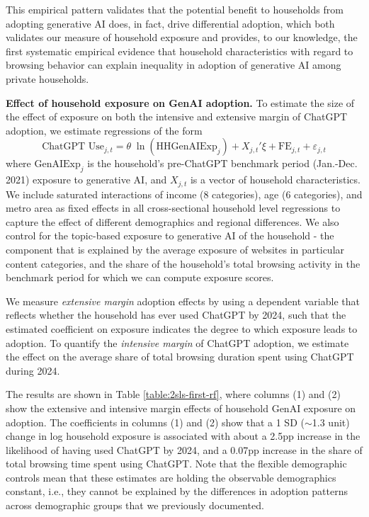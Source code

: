 \documentclass[12pt]{article}
\begin{document}
This empirical pattern validates that the potential benefit to households from adopting generative AI does, in fact, drive differential adoption, which both validates our measure of household exposure and provides, to our knowledge, the first systematic empirical evidence that household characteristics with regard to browsing behavior can explain inequality in adoption of generative AI among private households.

\textbf{Effect of household exposure on GenAI adoption.} To estimate the size of the effect of exposure on both the intensive and extensive margin of ChatGPT adoption, we estimate regressions of the form
\begin{equation}
\text{ChatGPT Use}_{j,t} = \theta\; \ln(\text{HHGenAIExp}_{j}) + X_{j,t}'\xi + \text{FE}_{j,t} +\varepsilon_{j,t} \label{eq:use}
\end{equation}
where $\text{GenAIExp}_{j}$ is the household's pre-ChatGPT benchmark period (Jan.-Dec. 2021) exposure to generative AI, and $X_{j,t}$ is a vector of household characteristics. We include saturated interactions of income (8 categories), age (6 categories), and metro area  as fixed effects in all cross-sectional household level regressions to capture the effect of different demographics and regional differences. We also control for the topic-based exposure to generative AI of the household - the component that is explained by the average exposure of websites in particular content categories, and the share of the household's total browsing activity in the benchmark period for which we can compute exposure scores.


We measure \textit{extensive margin} adoption effects by using a dependent variable that reflects whether the household has ever used ChatGPT by 2024, such that the estimated coefficient on exposure indicates the degree to which exposure leads to adoption. To quantify the \textit{intensive margin} of ChatGPT adoption, we estimate the effect on the average share of total browsing duration spent using ChatGPT during 2024.

The results are shown in Table \ref{table:2sls-first-rf}, where columns (1) and (2) show the extensive and intensive margin effects of household GenAI exposure on adoption. The coefficients in columns (1) and (2) show that a 1 SD ($\sim$1.3 unit) change in log household exposure is associated with about a 2.5pp increase in the likelihood of having used ChatGPT by 2024, and a 0.07pp increase in  the share of total browsing time spent using ChatGPT. Note that the flexible demographic controls mean that these estimates are holding the observable demographics constant, i.e., they cannot be explained by the differences in adoption patterns across demographic groups that we previously documented.
\end{document}
